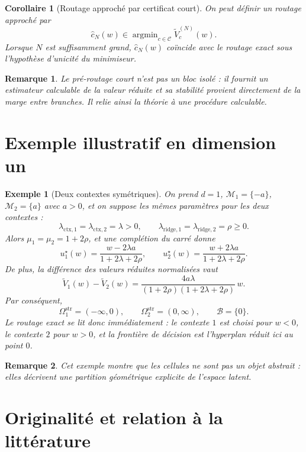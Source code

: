 \documentclass[11pt,a4paper]{article}
\newtheorem{corollary}{Corollaire}[section]
\newtheorem{remark}{Remarque}[section]
\newtheorem{example}{Exemple}[section]
\DeclareMathOperator{\argmin}{argmin}
\newcommand{\Mcal}{\mathcal M}
\newcommand{\Ccal}{\mathcal C}
\newcommand{\Bcal}{\mathcal B}
\begin{document}
\begin{corollary}[Routage approché par certificat court]
On peut définir un routage approché par
\[
\hat c_N(w)\in\argmin_{c\in\Ccal}\widetilde V_c^{(N)}(w).
\]
Lorsque \(N\) est suffisamment grand, \(\hat c_N(w)\) coïncide avec le routage exact sous l'hypothèse d'unicité du minimiseur.
\end{corollary}

\begin{remark}
Le pré-routage court n'est pas un bloc isolé : il fournit un estimateur calculable de la valeur réduite et sa stabilité provient directement de la marge entre branches. Il relie ainsi la théorie à une procédure calculable.
\end{remark}

\section{Exemple illustratif en dimension un}

\begin{example}[Deux contextes symétriques]
On prend \(d=1\), \(\Mcal_1=\{-a\}\), \(\Mcal_2=\{a\}\) avec \(a>0\), et on suppose les mêmes paramètres pour les deux contextes :
\[
\lambda_{\mathrm{ctx},1}=\lambda_{\mathrm{ctx},2}=\lambda>0,
\qquad
\lambda_{\mathrm{ridge},1}=\lambda_{\mathrm{ridge},2}=\rho\ge 0.
\]
Alors \(\mu_1=\mu_2=1+2\rho\), et une complétion du carré donne
\[
u_1^\star(w)=\frac{w-2\lambda a}{1+2\lambda+2\rho},
\qquad
u_2^\star(w)=\frac{w+2\lambda a}{1+2\lambda+2\rho}.
\]
De plus, la différence des valeurs réduites normalisées vaut
\[
\widetilde V_1(w)-\widetilde V_2(w)
=
\frac{4a\lambda}{(1+2\rho)(1+2\lambda+2\rho)}\,w.
\]
Par conséquent,
\[
\Omega_1^{\mathrm{str}}=(-\infty,0),
\qquad
\Omega_2^{\mathrm{str}}=(0,\infty),
\qquad
\Bcal=\{0\}.
\]
Le routage exact se lit donc immédiatement : le contexte \(1\) est choisi pour \(w<0\), le contexte \(2\) pour \(w>0\), et la frontière de décision est l'hyperplan réduit ici au point \(0\).
\end{example}

\begin{remark}
Cet exemple montre que les cellules ne sont pas un objet abstrait : elles décrivent une partition géométrique explicite de l'espace latent.
\end{remark}

\section{Originalité et relation à la littérature}
\end{document}
